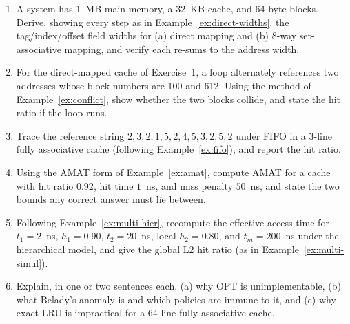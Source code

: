 \documentclass[11pt]{article}
\begin{document}
\begin{enumerate}
  \item A system has 1~MB main memory, a 32~KB cache, and 64-byte blocks. Derive, showing every step as in Example~\ref{ex:direct-widths}, the tag/index/offset field widths for (a) direct mapping and (b) 8-way set-associative mapping, and verify each re-sums to the address width.
  \item For the direct-mapped cache of Exercise~1, a loop alternately references two addresses whose block numbers are 100 and 612. Using the method of Example~\ref{ex:conflict}, show whether the two blocks collide, and state the hit ratio if the loop runs.
  \item Trace the reference string $2,3,2,1,5,2,4,5,3,2,5,2$ under FIFO in a 3-line fully associative cache (following Example~\ref{ex:fifo}), and report the hit ratio.
  \item Using the AMAT form of Example~\ref{ex:amat}, compute AMAT for a cache with hit ratio $0.92$, hit time $1$~ns, and miss penalty $50$~ns, and state the two bounds any correct answer must lie between.
  \item Following Example~\ref{ex:multi-hier}, recompute the effective access time for $t_1=2$~ns, $h_1=0.90$, $t_2=20$~ns, local $h_2=0.80$, and $t_m=200$~ns under the hierarchical model, and give the global L2 hit ratio (as in Example~\ref{ex:multi-simul}).
  \item Explain, in one or two sentences each, (a) why OPT is unimplementable, (b) what Belady's anomaly is and which policies are immune to it, and (c) why exact LRU is impractical for a 64-line fully associative cache.
\end{enumerate}
\end{document}
